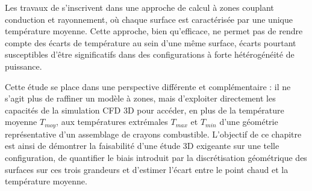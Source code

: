 
Les travaux de \cite{romain25} s'inscrivent dans une approche de calcul à zones couplant conduction et rayonnement, où chaque surface est caractérisée par une unique température moyenne. Cette approche, bien qu'efficace, ne permet pas de rendre compte des écarts de température au sein d'une même surface, écarts pourtant susceptibles d'être significatifs dans des configurations à forte hétérogénéité de puissance.

Cette étude se place dans une perspective différente et complémentaire : il ne s'agit plus de raffiner un modèle à zones, mais d'exploiter directement les capacités de la simulation CFD 3D pour accéder, en plus de la température moyenne $T_{moy}$, aux températures extrémales $T_{max}$ et $T_{min}$ d'une géométrie représentative d'un assemblage de crayons combustible. L'objectif de ce chapitre est ainsi de démontrer la faisabilité d'une étude 3D exigeante sur une telle configuration, de quantifier le biais introduit par la discrétisation géométrique des surfaces sur ces trois grandeurs et d'estimer l'écart entre le point chaud et la température moyenne.
